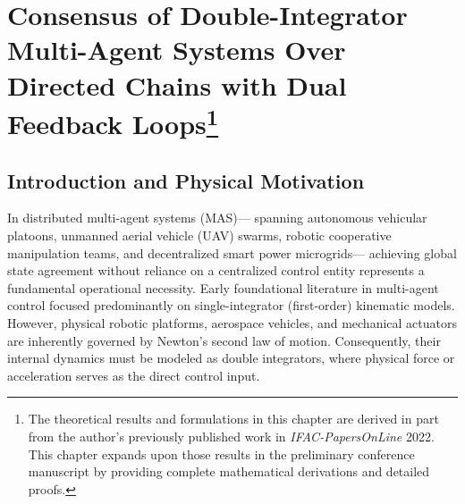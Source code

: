 \chapter[Consensus over Directed Chains with Dual Feedback Loops]{Consensus of Double-Integrator Multi-Agent Systems Over Directed Chains with Dual Feedback Loops\footnote{The theoretical results and formulations in this chapter are derived in part from the author's previously published work in \emph{IFAC-PapersOnLine} 2022. This chapter expands upon those results in the preliminary conference manuscript by providing complete mathematical derivations and detailed proofs.}}\label{ch:TwoReverseEdges}
\section{Introduction and Physical Motivation}\label{sec:ch_TRE_Intro}

In distributed multi-agent systems (MAS)— spanning autonomous vehicular platoons, unmanned aerial vehicle (UAV) swarms, robotic cooperative manipulation teams, and decentralized smart power microgrids— achieving global state agreement without reliance on a centralized control entity represents a fundamental operational necessity. Early foundational literature in multi-agent control focused predominantly on single-integrator (first-order) kinematic models. However, physical robotic platforms, aerospace vehicles, and mechanical actuators are inherently governed by Newton's second law of motion. Consequently, their internal dynamics must be modeled as double integrators, where physical force or acceleration serves as the direct control input.

